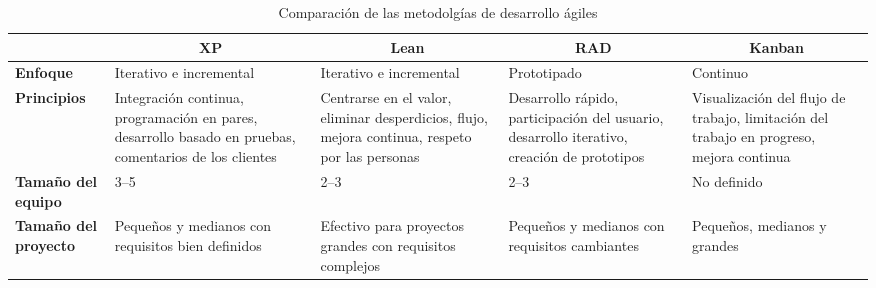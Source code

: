 \newpage
\begin{footnotesize}
\begin{spacing}{1}
    \begin{center}
        \renewcommand*{\arraystretch}{1.4}
        \begin{longtable}[l]{ |>{\bfseries}p{}| p{} |p{}  |p{} | p{}|}
            \caption[Comparación de las metodolgías de desarrollo ágiles]{ Comparación de las metodolgías de desarrollo ágiles\cite{barriga_sanchez_sistema_2023} }\label{tab:table_metodologias_agiles} \\
            \hline
            \multicolumn{1}{|c|}{ \textbf{Criterio}} & \multicolumn{1}{c|}{\textbf{XP}}                                                                        & \multicolumn{1}{c|}{ \textbf{Lean}} & \multicolumn{1}{c|}{ \textbf{RAD}}  & \multicolumn{1}{c|}{ \textbf{Kanban}}\\
            \hline
            Enfoque                                & Iterativo e incremental                                                                                & Iterativo e incremental                                                                        & Prototipado                                                                                & Continuo                                                                                \\
            \hline
            Principios                             & Integración continua, programación en pares, desarrollo basado en pruebas, comentarios de los clientes & Centrarse en el valor, eliminar desperdicios, flujo, mejora continua, respeto por las personas & Desarrollo rápido, participación del usuario, desarrollo iterativo, creación de prototipos & Visualización del flujo de trabajo, limitación del trabajo en progreso, mejora continua \\
            \hline
            Tamaño del equipo                      & 3--5                                                                                                   & 2--3                                                                                           & 2--3                                                                                       & No definido                                                                             \\
            \hline
            Tamaño del proyecto                    & Pequeños y medianos con requisitos bien definidos                                                      & Efectivo para proyectos grandes con requisitos complejos & Pequeños y medianos con requisitos cambiantes & Pequeños, medianos y grandes \\

\end{longtable}
\end{center}
\end{spacing}
\end{footnotesize}
